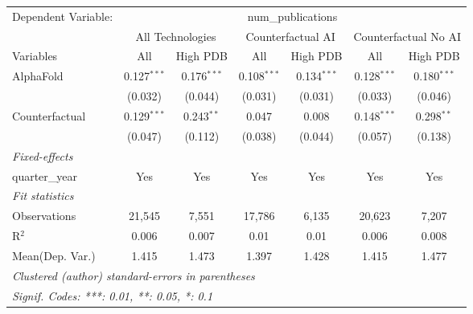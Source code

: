 \begingroup
\centering
\begin{tabular}{lcccccc}
   \tabularnewline \midrule \midrule
   Dependent Variable: & \multicolumn{6}{c}{num\_publications}\\
 & \multicolumn{2}{c}{All Technologies} & \multicolumn{2}{c}{Counterfactual AI} & \multicolumn{2}{c}{Counterfactual No AI} \\
\cmidrule(lr){1-1}\cmidrule(lr){2-3} \cmidrule(lr){4-5} \cmidrule(lr){6-7}
Variables & \multicolumn{1}{c}{All} & \multicolumn{1}{c}{High PDB} & \multicolumn{1}{c}{All} & \multicolumn{1}{c}{High PDB} & \multicolumn{1}{c}{All} & \multicolumn{1}{c}{High PDB} \\
\cmidrule(lr){1-1}\cmidrule(lr){2-2} \cmidrule(lr){3-3} \cmidrule(lr){4-4} \cmidrule(lr){5-5} \cmidrule(lr){6-6} \cmidrule(lr){7-7}
   AlphaFold      & 0.127$^{***}$ & 0.176$^{***}$ & 0.108$^{***}$ & 0.134$^{***}$ & 0.128$^{***}$ & 0.180$^{***}$\\   
                  & (0.032)       & (0.044)       & (0.031)       & (0.031)       & (0.033)       & (0.046)\\   
   Counterfactual & 0.129$^{***}$ & 0.243$^{**}$  & 0.047         & 0.008         & 0.148$^{***}$ & 0.298$^{**}$\\   
                  & (0.047)       & (0.112)       & (0.038)       & (0.044)       & (0.057)       & (0.138)\\   
   \midrule
   \emph{Fixed-effects}\\
   quarter\_year  & Yes           & Yes           & Yes           & Yes           & Yes           & Yes\\  
   \midrule
   \emph{Fit statistics}\\
   Observations   & 21,545        & 7,551         & 17,786        & 6,135         & 20,623        & 7,207\\  
   R$^2$          & 0.006         & 0.007         & 0.01          & 0.01          & 0.006         & 0.008\\  
Mean(Dep. Var.) & 1.415 & 1.473 & 1.397 & 1.428 & 1.415 & 1.477 \\
   \midrule \midrule
   \multicolumn{7}{l}{\emph{Clustered (author) standard-errors in parentheses}}\\
   \multicolumn{7}{l}{\emph{Signif. Codes: ***: 0.01, **: 0.05, *: 0.1}}\\
\end{tabular}
\par\endgroup

